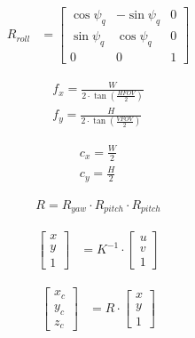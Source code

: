 \documentclass[12pt]{article}       %
\begin{document}
\begin{align}
    R_{roll} &=
    \begin{bmatrix}
        \cos\psi_{q}   & -\sin\psi_{q}  & 0 \\
        \sin\psi_{q}   & \cos\psi_{q}   & 0 \\
        0              & 0              & 1
    \end{bmatrix} 
    \label{eq:rroll}
\end{align}

\begin{align}
    f_{x}=\frac{W}{2\cdot\tan\left(\frac{HFOV}{2}\right)}
    \label{eq:fx}
    \\
    f_{y}=\frac{H}{2\cdot\tan\left(\frac{VFOV}{2}\right)}
    \label{eq:fy}
\end{align}


\begin{align}
    c_{x}=\frac{W}{2}
    \label{eq:cx}
    \\
    c_{y}=\frac{H}{2}
    \label{eq:cy}
\end{align}



\begin{align}
    R=R_{yaw}\cdot R_{pitch} \cdot R_{pitch}
    \label{eq:R}
\end{align}


\begin{align}
    \begin{bmatrix}
        x       \\
        y    \\
        1        
    \end{bmatrix} 
     &=K^{-1}\cdot
     \begin{bmatrix}
        u       \\
        v       \\
        1        
    \end{bmatrix} 
    \label{eq:xy1}
\end{align}

\begin{align}
    \begin{bmatrix}
        x_{c}   \\
        y_{c}   \\
        z_{c}        
    \end{bmatrix} 
     &=R\cdot
     \begin{bmatrix}
        x       \\
        y       \\
        1        
    \end{bmatrix} 
    \label{eq:xcyczc}
\end{align}
\end{document}
